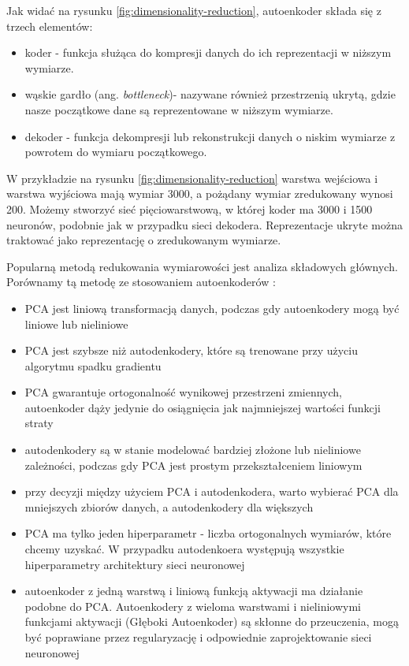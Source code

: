 \documentclass[12pt]{mwbk}
\theoremstyle{plain}
\theoremstyle{definition}
\theoremstyle{remark}
\begin{document}
\noindent Jak widać na rysunku \ref{fig:dimensionality-reduction}, autoenkoder składa się z trzech elementów:

\begin{itemize}

\item koder - funkcja służąca do kompresji danych do ich reprezentacji w niższym wymiarze.

\item wąskie gardło (ang. \emph{bottleneck})- nazywane również przestrzenią ukrytą, gdzie nasze początkowe dane są reprezentowane w niższym wymiarze.

\item dekoder - funkcja dekompresji lub rekonstrukcji danych o niskim wymiarze z powrotem do wymiaru początkowego.

\end{itemize}

W przykładzie na rysunku \ref{fig:dimensionality-reduction} warstwa wejściowa i warstwa wyjściowa mają wymiar 3000, a pożądany wymiar zredukowany wynosi 200. Możemy stworzyć sieć pięciowarstwową, w której koder ma 3000 i 1500 neuronów, podobnie jak w przypadku sieci dekodera. Reprezentacje ukryte można traktować jako reprezentację o zredukowanym wymiarze.

Popularną metodą redukowania wymiarowości jest analiza składowych głównych. Porównamy tą metodę ze stosowaniem autoenkoderów \cite{mungoli}:

\begin{itemize}

\item  PCA jest liniową transformacją danych, podczas gdy autoenkodery mogą być liniowe lub nieliniowe

\item PCA jest szybsze niż autodenkodery, które są trenowane przy użyciu algorytmu spadku gradientu 

\item PCA gwarantuje ortogonalność wynikowej przestrzeni zmiennych, autoenkoder dąży jedynie do osiągnięcia jak najmniejszej wartości funkcji straty

\item autodenkodery są w stanie modelować bardziej złożone lub nieliniowe zależności, podczas gdy PCA jest prostym przekształceniem liniowym

\item  przy decyzji między użyciem PCA i autodenkodera, warto wybierać PCA dla mniejszych zbiorów danych, a autodenkodery dla większych

\item PCA ma tylko jeden hiperparametr - liczba ortogonalnych wymiarów, które chcemy uzyskać. W przypadku autodenkoera występują wszystkie hiperparametry architektury sieci neuronowej

\item autoenkoder z jedną warstwą i liniową funkcją aktywacji ma działanie podobne do PCA. Autoenkodery z wieloma warstwami i nieliniowymi funkcjami aktywacji (Głęboki Autoenkoder) są skłonne do przeuczenia, mogą być poprawiane przez regularyzację i odpowiednie zaprojektowanie sieci neuronowej

\end{itemize}
\end{document}
